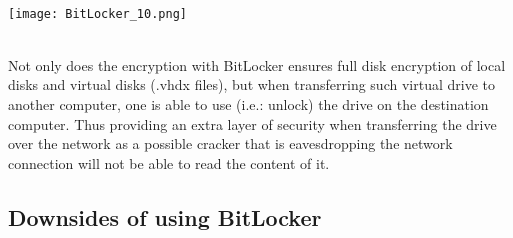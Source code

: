 $\;$ \\ \\
\noindent\begin{minipage}{\textwidth}
    \centering
    \texttt{[image: BitLocker\_10.png]}
\end{minipage}
$\;$ \\ \\
Not only does the encryption with BitLocker ensures full disk encryption of local disks and virtual disks (.vhdx files), but when transferring such virtual drive to another computer, one is able to use (i.e.: unlock) the drive on the destination computer. Thus providing an extra layer of security when transferring the drive over the network as a possible cracker that is eavesdropping the network connection will not be able to read the content of it.

\subsection{Downsides of using BitLocker}

